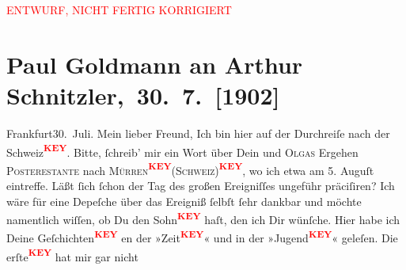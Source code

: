 
\begin{center}
            \textcolor{red}{ENTWURF, NICHT FERTIG KORRIGIERT}
                      \end{center}
            
         
         \renewcommand{\erwaehntePersonen}{Personen: Olga Schnitzler}
         \renewcommand{\erwaehnteOrte}{Orte: Frankfurt am Main, Wien}
         \renewcommand{\erwaehnteWerke}{Werke: Der Schleier der Beatrice. Schauspiel in fünf Akten}
               \section[ Paul Goldmann an Arthur Schnitzler, 30. 7. {[}1902{]}]{ Paul Goldmann an Arthur Schnitzler, 30. 7. {[}1902{]}}\nopagebreak{}\rehead{ }\begin{ledgroupsized}[t]{13cm}\normalsize\beginnumbering \toendnotes[C]{\smallbreak\pagebreak[2]} 
\pstart
           \centering{}{\pb}Frankfurt30. Juli.\pend
           \pstart\center{}Mein lieber Freund,\pend\pstart
           Ich bin hier auf der Durchreiſe nach der Schweiz\textcolor{red}{\textsuperscript{\textbf{KEY}}}.
                    Bitte, ſchreib’ mir ein Wort über Dein und \textsc{Olgas} Ergehen \textsc{Poste}\textsc{restante} nach \textsc{Mürren\textcolor{red}{\textsuperscript{\textbf{KEY}}}}\textsc{(Schweiz)\textcolor{red}{\textsuperscript{\textbf{KEY}}}}, wo ich etwa \strikeout{\textcolor{gray}{den}} am 5. Auguſt eintreffe. Läßt ſich ſchon der Tag des großen
                        {\pb} Ereigniſſes ungeführ präciſiren? Ich wäre für eine Depeſche  über das Ereigniß ſelbſt ſehr dankbar und
                    möchte namentlich wiſſen, ob Du den Sohn\textcolor{red}{\textsuperscript{\textbf{KEY}}} haſt,
                         den ich Dir wünſche. \pend
           \pstart
           Hier habe ich Deine Geſchichten\textcolor{red}{\textsuperscript{\textbf{KEY}}} en der »Zeit\textcolor{red}{\textsuperscript{\textbf{KEY}}}« und in der »Jugend\textcolor{red}{\textsuperscript{\textbf{KEY}}}« geleſen. Die erſte\textcolor{red}{\textsuperscript{\textbf{KEY}}} hat mir gar nicht

\end{ledgroupsized}
